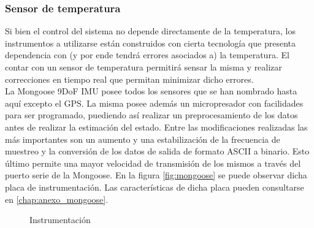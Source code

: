 \documentclass[main]{subfiles}
\begin{document}
\subsubsection{Sensor de temperatura}

Si bien el control del sistema no depende directamente de la temperatura, los instrumentos a utilizarse est\'an construidos con cierta tecnolog\'ia que presenta dependencia con (y por ende tendr\'a errores asociados a) la temperatura. El contar con un sensor de temperatura permitir\'a sensar la misma y realizar correcciones en tiempo real que permitan minimizar dicho errores.\\

La Mongoose 9DoF IMU posee todos los sensores que se han nombrado hasta aqu\'i excepto el GPS. La misma posee adem\'as un micropresador con facilidades para ser programado, puediendo as\'i realizar un preprocesamiento de los datos antes de realizar la estimaci\'on del estado. Entre las modificaciones realizadas las m\'as importantes son un aumento y una estabilizaci\'on de la frecuencia de muestreo y la conversi\'on de los datos de salida de formato ASCII a binario. Esto \'ultimo permite una mayor velocidad de transmisi\'on de los mismos a trav\'es del puerto serie de la Mongoose. En la figura \ref{fig:mongoose} se puede observar dicha placa de instrumentaci\'on. Las caracter\'isticas de dicha placa pueden consultarse en \ref{chap:anexo_mongoose}.


\begin{figure} 
  \centering
  
  \caption{Instrumentaci\'on}
  \label{fig:intrumentacion}
\end{figure}
\end{document}
